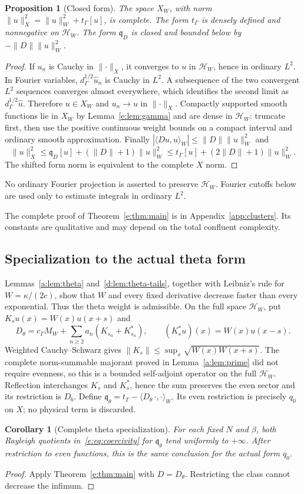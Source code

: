 \documentclass[11pt,a4paper]{article}
\numberwithin{equation}{section}
\newtheorem{proposition}[theorem]{Proposition}
\newtheorem{corollary}[theorem]{Corollary}
\theoremstyle{definition}\newtheorem{definition}[theorem]{Definition}
\theoremstyle{remark}\newtheorem{remark}[theorem]{Remark}
\newcommand{\HH}{\mathcal H_W}\newcommand{\XX}{X_W}\newcommand{\EE}{\mathcal E_{N,\beta}}
\newcommand{\tg}{t_\Gamma}\newcommand{\cg}{c_\Gamma}
\newcommand{\qD}{\mathfrak q_D}\newcommand{\qth}{\mathfrak q_\theta}
\newcommand{\ip}[2]{\langle#1,#2\rangle}\newcommand{\norm}[1]{\lVert#1\rVert}\newcommand{\abs}[1]{\lvert#1\rvert}
\begin{document}
\begin{proposition}[Closed form]\label{e:prop:closed}
The space $\XX$, with norm
$\norm u_X^2=\norm u_W^2+\tg[u]$, is complete. The form $\tg$ is densely
defined and nonnegative on $\HH$. The form $\qD$ is closed and bounded
below by $-\norm D\norm u_W^2$.
\end{proposition}
\begin{proof}
If $u_n$ is Cauchy in $\norm{\cdot}_X$, it converges to $u$ in $\HH$,
hence in ordinary $L^2$. In Fourier variables,
$d_\Gamma^{1/2}\widehat u_n$ is Cauchy in $L^2$. A subsequence of the two
convergent $L^2$ sequences converges almost everywhere, which identifies
the second limit as $d_\Gamma^{1/2}\widehat u$. Therefore $u\in\XX$ and
$u_n\to u$ in $\norm{\cdot}_X$. Compactly supported smooth functions lie
in $\XX$ by Lemma~\ref{e:lem:gamma} and are dense in $\HH$: truncate first,
then use the positive continuous weight bounds on a compact interval and
ordinary smooth approximation. Finally
$|\ip{Du}{u}_W|\le\norm D\norm u_W^2$ and
\[
 \norm u_X^2\le \qD[u]+(\norm D+1)\norm u_W^2
 \le \tg[u]+(2\norm D+1)\norm u_W^2.
\]
The shifted form norm is equivalent to the complete $X$ norm.
\end{proof}

No ordinary Fourier projection is asserted to preserve $\HH$. Fourier
cutoffs below are used only to estimate integrals in ordinary $L^2$.


The complete proof of Theorem~\ref{e:thm:main} is in Appendix~\ref{app:clusters}. Its constants are qualitative and may depend on the total confluent complexity.


\subsection{Specialization to the actual theta form}\label{e:sec:theta}
Lemmas~\ref{a:lem:theta} and~\ref{d:lem:theta-tails}, together with Leibniz's rule for $W=\kappa/(2c)$, show that $W$ and every fixed derivative decrease faster than every exponential. Thus the theta weight is admissible. On the full space $\HH$, put $K_su(x)=W(x)u(x+s)$ and
\[
 D_\theta=\cg M_W+\sum_{n\ge2}a_n(K_{s_n}+K_{s_n}^*),\qquad
 (K_s^*u)(x)=W(x)u(x-s).
\]
Weighted Cauchy--Schwarz gives $\norm{K_s}\le\sup_x\sqrt{W(x)W(x+s)}$. The complete norm-summable majorant proved in Lemma~\ref{a:lem:prime} did not require evenness, so this is a bounded self-adjoint operator on the full $\HH$. Reflection interchanges $K_s$ and $K_s^*$, hence the sum preserves the even sector and its restriction is $D_b$. Define $\qth=\tg-\ip{D_\theta\,\cdot}{\cdot}_W$. Its even restriction is precisely $q_0$ on $X$; no physical term is discarded.
\begin{corollary}[Complete theta specialization]\label{e:cor:theta}
For each fixed $N$ and $\beta$, both Rayleigh quotients in~\eqref{e:eq:coercivity} for $\qth$ tend uniformly to $+\infty$. After restriction to even functions, this is the same conclusion for the actual form $q_0$.
\end{corollary}
\begin{proof}
Apply Theorem~\ref{e:thm:main} with $D=D_\theta$. Restricting the class cannot decrease the infimum.
\end{proof}
\end{document}
